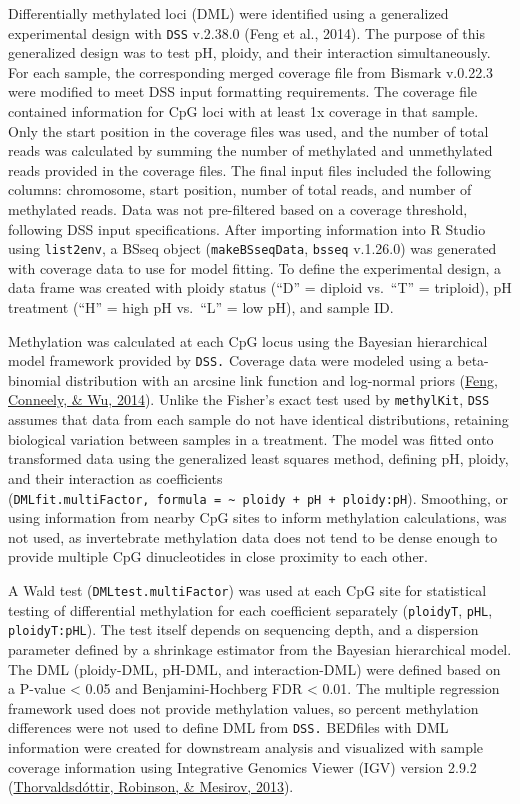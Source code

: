 \documentclass [11pt, proquest] {uwthesis}[2015/03/03]
\begin{document}
Differentially methylated loci (DML) were identified using a generalized experimental design with \texttt{DSS} v.2.38.0 (Feng et al., 2014). The purpose of this generalized design was to test pH, ploidy, and their interaction simultaneously. For each sample, the corresponding merged coverage file from Bismark v.0.22.3 were modified to meet DSS input formatting requirements. The coverage file contained information for CpG loci with at least 1x coverage in that sample. Only the start position in the coverage files was used, and the number of total reads was calculated by summing the number of methylated and unmethylated reads provided in the coverage files. The final input files included the following columns: chromosome, start position, number of total reads, and number of methylated reads. Data was not pre-filtered based on a coverage threshold, following DSS input specifications. After importing information into R Studio using \texttt{list2env}, a BSseq object (\texttt{makeBSseqData}, \texttt{bsseq} v.1.26.0) was generated with coverage data to use for model fitting. To define the experimental design, a data frame was created with ploidy status (``D'' = diploid vs.~``T'' = triploid), pH treatment (``H'' = high pH vs.~``L'' = low pH), and sample ID.

Methylation was calculated at each CpG locus using the Bayesian hierarchical model framework provided by \texttt{DSS.} Coverage data were modeled using a beta-binomial distribution with an arcsine link function and log-normal priors (\protect\hyperlink{ref-Feng2014}{Feng, Conneely, \& Wu, 2014}). Unlike the Fisher's exact test used by \texttt{methylKit}, \texttt{DSS} assumes that data from each sample do not have identical distributions, retaining biological variation between samples in a treatment. The model was fitted onto transformed data using the generalized least squares method, defining pH, ploidy, and their interaction as coefficients (\texttt{DMLfit.multiFactor,\ formula\ =\ \textasciitilde{}\ ploidy\ +\ pH\ +\ ploidy:pH}). Smoothing, or using information from nearby CpG sites to inform methylation calculations, was not used, as invertebrate methylation data does not tend to be dense enough to provide multiple CpG dinucleotides in close proximity to each other.

A Wald test (\texttt{DMLtest.multiFactor}) was used at each CpG site for statistical testing of differential methylation for each coefficient separately (\texttt{ploidyT}, \texttt{pHL}, \texttt{ploidyT:pHL}). The test itself depends on sequencing depth, and a dispersion parameter defined by a shrinkage estimator from the Bayesian hierarchical model. The DML (ploidy-DML, pH-DML, and interaction-DML) were defined based on a P-value \textless{} 0.05 and Benjamini-Hochberg FDR \textless{} 0.01. The multiple regression framework used does not provide methylation values, so percent methylation differences were not used to define DML from \texttt{DSS.} BEDfiles with DML information were created for downstream analysis and visualized with sample coverage information using Integrative Genomics Viewer (IGV) version 2.9.2 (\protect\hyperlink{ref-Thorvaldsdottir2013}{Thorvaldsdóttir, Robinson, \& Mesirov, 2013}).
\end{document}
